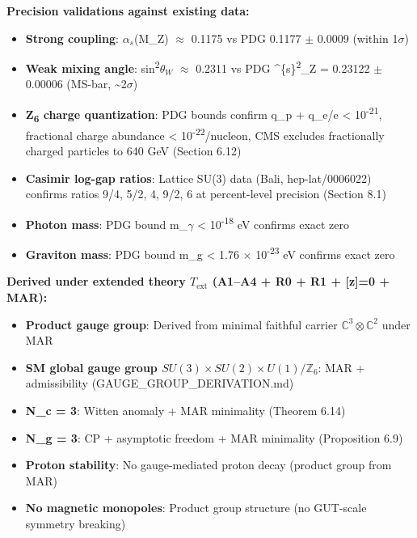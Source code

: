 \documentclass[11pt,a4paper]{article}
\theoremstyle{remark}
\providecommand{\tightlist}{%
  \setlength{\itemsep}{0pt}\setlength{\parskip}{0pt}}
\begin{document}
\textbf{Precision validations against existing data:}

\begin{itemize}
\tightlist
\item
  \textbf{Strong coupling}: \(\alpha_s\)(M\_Z) \ensuremath{\approx} 0.1175 vs PDG 0.1177 \ensuremath{\pm} 0.0009 (within 1\ensuremath{\sigma})
\item
  \textbf{Weak mixing angle}: sin\textsuperscript{2}\(\theta_W\) \ensuremath{\approx} 0.2311 vs PDG \^{}\{s\}\textsuperscript{2}\_Z = 0.23122 \ensuremath{\pm} 0.00006 (MS-bar, \textasciitilde2\ensuremath{\sigma})
\item
  \textbf{Z\textsubscript{6} charge quantization}: PDG bounds confirm \textbar q\_p + q\_e\textbar/e \textless{} 10\textsuperscript{-21}, fractional charge abundance \textless{} 10\textsuperscript{-22}/nucleon, CMS excludes fractionally charged particles to 640 GeV (Section 6.12)
\item
  \textbf{Casimir log-gap ratios}: Lattice SU(3) data (Bali, hep-lat/0006022) confirms ratios 9/4, 5/2, 4, 9/2, 6 at percent-level precision (Section 8.1)
\item
  \textbf{Photon mass}: PDG bound m\_\ensuremath{\gamma} \textless{} 10\textsuperscript{-18} eV confirms exact zero
\item
  \textbf{Graviton mass}: PDG bound m\_g \textless{} 1.76 \ensuremath{\times} 10\textsuperscript{-23} eV confirms exact zero
\end{itemize}

\textbf{Derived under extended theory \(T_{\mathrm{ext}}\) (A1--A4 + R0 + R1 + {[}z{]}=0 + MAR):}

\begin{itemize}
\tightlist
\item
  \textbf{Product gauge group}: Derived from minimal faithful carrier \(\mathbb{C}^3 \otimes \mathbb{C}^2\) under MAR
\item
  \textbf{SM global gauge group \(SU(3) \times SU(2) \times U(1)/\mathbb{Z}_6\)}: MAR + admissibility (GAUGE\_GROUP\_DERIVATION.md)
\item
  \textbf{N\_c = 3}: Witten anomaly + MAR minimality (Theorem 6.14)
\item
  \textbf{N\_g = 3}: CP + asymptotic freedom + MAR minimality (Proposition 6.9)
\item
  \textbf{Proton stability}: No gauge-mediated proton decay (product group from MAR)
\item
  \textbf{No magnetic monopoles}: Product group structure (no GUT-scale symmetry breaking)
\end{itemize}
\end{document}
